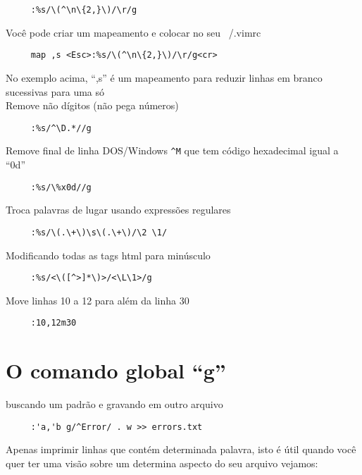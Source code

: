 \begin{verbatim}
     :%s/\(^\n\{2,}\)/\r/g
\end{verbatim}

Você pode criar um mapeamento e colocar no seu ~/.vimrc

\begin{verbatim}
     map ,s <Esc>:%s/\(^\n\{2,}\)/\r/g<cr>
\end{verbatim}

No exemplo acima, ``,s'' é um mapeamento para reduzir linhas em branco
sucessivas para uma só  \\


Remove não dígitos (não pega números)

\begin{verbatim}
     :%s/^\D.*//g
\end{verbatim}

Remove final de linha DOS/Windows \verb|^M| que tem código hexadecimal igual a
``0d''

\begin{verbatim}
     :%s/\%x0d//g
\end{verbatim}

Troca palavras de lugar usando expressões regulares

\begin{verbatim}
     :%s/\(.\+\)\s\(.\+\)/\2 \1/
\end{verbatim}

Modificando todas as tags html para minúsculo

\begin{verbatim}
     :%s/<\([^>]*\)>/<\L\1>/g
\end{verbatim}

Move linhas 10 a 12 para além da linha 30

\begin{verbatim}
     :10,12m30
\end{verbatim}

\section{O comando global ``g''}\label{sec:O comando global ``g''}

buscando um padrão e gravando em outro arquivo

\begin{verbatim}
     :'a,'b g/^Error/ . w >> errors.txt
\end{verbatim}

Apenas imprimir linhas que contém determinada palavra, isto é útil 
quando você quer ter uma visão sobre um determina aspecto 
do seu arquivo vejamos:

